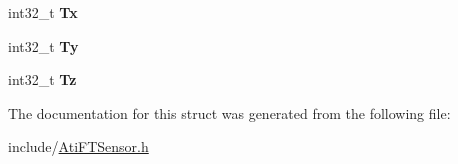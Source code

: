 \begin{DoxyCompactItemize}
\item 
int32\+\_\+t {\bfseries Tx}\hypertarget{structati__ft__sensor_1_1AtiFTSensor_1_1received__msg_a855dd741933afd6f75781246f32e3101}{}\label{structati__ft__sensor_1_1AtiFTSensor_1_1received__msg_a855dd741933afd6f75781246f32e3101}

\item 
int32\+\_\+t {\bfseries Ty}\hypertarget{structati__ft__sensor_1_1AtiFTSensor_1_1received__msg_a5569ea2c232fa28db4dece6c78f45f58}{}\label{structati__ft__sensor_1_1AtiFTSensor_1_1received__msg_a5569ea2c232fa28db4dece6c78f45f58}

\item 
int32\+\_\+t {\bfseries Tz}\hypertarget{structati__ft__sensor_1_1AtiFTSensor_1_1received__msg_a94fdb31f5268b90ecc2a50ebd57691f5}{}\label{structati__ft__sensor_1_1AtiFTSensor_1_1received__msg_a94fdb31f5268b90ecc2a50ebd57691f5}

\end{DoxyCompactItemize}


The documentation for this struct was generated from the following file\+:\begin{DoxyCompactItemize}
\item 
include/\hyperlink{AtiFTSensor_8h}{Ati\+F\+T\+Sensor.\+h}\end{DoxyCompactItemize}
